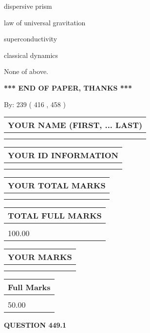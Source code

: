 \documentclass[12pt]{article}
\begin{document}
 
dispersive prism
 
 
law of universal gravitation
 
 
superconductivity
 
 
classical dynamics
 
 
 None of above.
 
 
   
   
\vspace{1.0in} 
{\textbf{\large{ *** END OF PAPER, THANKS *** }}} 
   
   
\hspace{1.0in} By: 
 239 ( 416 ,  458 )
   
   
   
   
\newpage 
\setcounter{page}{ 
   449001 } 
   
   
   
   
\noindent\begin{tabular}{|l|}
\hline
YOUR NAME (FIRST, ... LAST)  \\
\hline
 \\ 
 \\ 
\hline
\end{tabular}
\hspace{0.05in} \begin{tabular}{|l|}
\hline
 YOUR   ID   INFORMATION  \\
\hline
 \\ 
 \\ 
\hline
\end{tabular}
   
   
\vspace{0.2in}\noindent\begin{tabular}{|l|}
\hline
YOUR TOTAL MARKS  \\
\hline
 \\ 
 \\ 
\hline
\end{tabular}
\hspace{0.05in} \begin{tabular}{|l|}
\hline
TOTAL FULL MARKS  \\
\hline
 \\ 
100.00 \\
\hline
\end{tabular}
  
\vspace{0.2in}
  
\noindent\begin{tabular}{|l|}
\hline
 YOUR MARKS  \\
\hline
 \\ 
 \\ 
\hline
\end{tabular}
\hspace{0.05in} \begin{tabular}{|l|}
\hline
 Full Marks  \\
\hline
 \\ 
50.00 \\
\hline
\end{tabular}
{\textbf{\Large{QUESTION
449.1 
}}}
  
\end{document}
